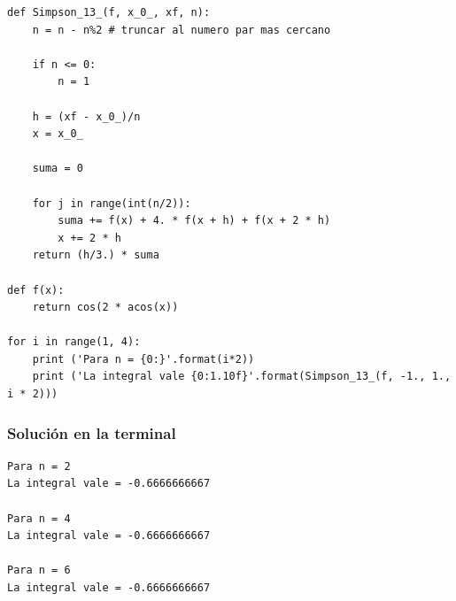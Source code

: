 \begin{frame}
\begin{lstlisting}[caption=Propuesta de código, style=FormattedNumber, basicstyle=\linespread{1.1}\ttfamily=\small, columns=fullflexible]
def Simpson_13_(f, x_0_, xf, n):
    n = n - n%2 # truncar al numero par mas cercano
     
    if n <= 0:
        n = 1
   
    h = (xf - x_0_)/n
    x = x_0_
   
    suma = 0
   
    for j in range(int(n/2)):
        suma += f(x) + 4. * f(x + h) + f(x + 2 * h)
        x += 2 * h
    return (h/3.) * suma

def f(x):
    return cos(2 * acos(x))

for i in range(1, 4):
    print ('Para n = {0:}'.format(i*2))
    print ('La integral vale {0:1.10f}'.format(Simpson_13_(f, -1., 1., i * 2)))
\end{lstlisting}
\end{frame}
\begin{frame}[fragile]
\frametitle{Solución en la terminal}
\begin{verbatim}
Para n = 2
La integral vale = -0.6666666667

Para n = 4
La integral vale = -0.6666666667

Para n = 6
La integral vale = -0.6666666667
\end{verbatim}
\end{frame}
